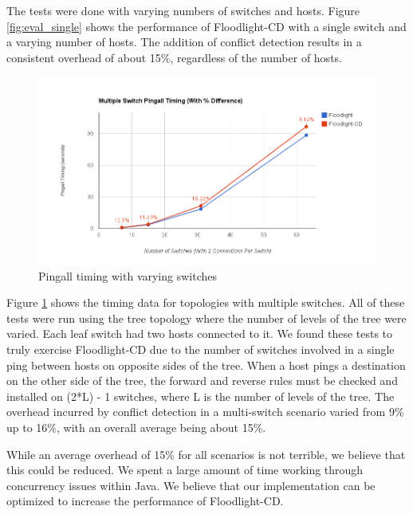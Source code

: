 The tests were done with varying numbers of switches and hosts.
Figure \ref{fig:eval_single} shows the performance of Floodlight-CD with a single switch and a varying number of hosts.
The addition of conflict detection results in a consistent overhead of about 15\%, regardless of the number of hosts.

\begin{figure}[ht!]
	\begin{center}
		\includegraphics[scale=.5]{figs/multiSwitch_eval.png}
		\caption{Pingall timing with varying switches}
		\label{fig:eval_multi}
	\end{center}
\end{figure}

Figure \ref{fig:eval_multi} shows the timing data for topologies with multiple switches.
All of these tests were run using the tree topology where the number of levels of the tree were varied.
Each leaf switch had two hosts connected to it.
We found these tests to truly exercise Floodlight-CD due to the number of switches involved in a single ping between hosts on opposite sides of the tree.
When a host pings a destination on the other side of the tree, the forward and reverse rules must be checked and installed on (2*L) - 1 switches, where L is the number of levels of the tree. 
The overhead incurred by conflict detection in a multi-switch scenario varied from 9\% up to 16\%, with an overall average being about 15\%.

While an average overhead of 15\% for all scenarios is not terrible, we believe that this could be reduced.
We spent a large amount of time working through concurrency issues within Java.
We believe that our implementation can be optimized to increase the performance of Floodlight-CD.

